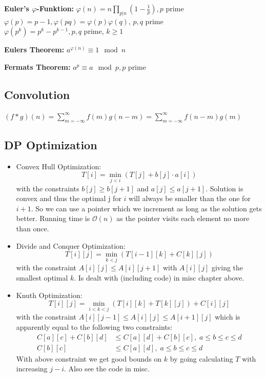 \documentclass[10pt,a4paper,ngerman,oneside,]{article}
\begin{document}
\begin{multicols}{2}
\textbf{Euler's $\varphi$-Funktion:} $\varphi(n)=n\prod_{p|n}(1-\frac{1}{p}),p$ prime\\
$\varphi(p)=p-1,\varphi(pq)=\varphi(p)\varphi(q)$, $p,q$ prime\\
$\varphi(p^k)=p^k-p^{k-1},p,q$ prime, $k\geq 1$

\textbf{Eulers Theorem:} $a^{\varphi(n)}\equiv 1\mod n$

\textbf{Fermats Theorem:} $a^{p}\equiv a\mod p, p$ prime

\subsection{Convolution}
$
(f\ast g)(n) = \sum\limits_{m=-\infty}^{\infty}f(m)g(n-m)=\sum\limits_{m=-\infty}^{\infty}f(n-m)g(m)
$

\subsection{DP Optimization}
\begin{itemize}
\item Convex Hull Optimization:
  \[
    T[i] = \min_{j < i} (T[j] + b[j]\cdot a[i])
  \]
  with the constraints $b[j] \geq b[j + 1]$ and $a[j] \leq a[j + 1]$. Solution is convex and thus the optimal j for $i$ will always be smaller than the one for $i+1$. So we can use a pointer which we increment as long as the solution gets better. Running time is $\mathcal{O}(n)$ as the pointer visits each element no more than once.
\item Divide and Conquer Optimization:
  \[
    T[i][j] = \min_{k < j} (T[i-1][k] + C[k][j])
  \]
  with the constraint $A[i][j] \leq A[i][j+1]$ with $A[i][j]$ giving the smallest optimal $k$. Is dealt with (including code) in misc chapter above.
\item Knuth Optimization:
  \[
    T[i][j] = \min_{i < k < j}(T[i][k]  + T[k][j]) + C[i][j]
  \]
  with the constraint $A[i][j-1] \leq A[i][j] \leq A[i+1][j]$ which is apparently equal to the following two constraints:
  \begin{align*}
    C[a][c] + C[b][d] &\leq C[a][d] + C[b][c], \; a \leq b \leq c \leq d \\
    C[b][c] &\leq C[a][d], \; a \leq b \leq c \leq d
  \end{align*}
  With above constraint we get good bounds on $k$ by going calculating $T$ with increasing $j - i$. Also see the code in misc.
\end{itemize}
\end{multicols}


\end{document}
